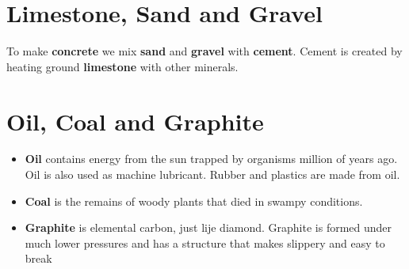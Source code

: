 \documentclass[12pt, letterpaper, twoside]{article}
\begin{document}
\section{Limestone, Sand and Gravel}
To make \textbf{concrete} we mix \textbf{sand} and \textbf{gravel} with \textbf{cement}. Cement is created by heating ground \textbf{limestone} with other minerals. 

\section{Oil, Coal and Graphite}
	\begin{itemize}
		\item \textbf{Oil} contains energy from the sun trapped by organisms million of years ago. Oil is also used as machine lubricant. Rubber and plastics are made from oil.
		\item \textbf{Coal} is the remains of woody plants that died in swampy conditions.
		\item \textbf{Graphite} is elemental carbon, just lije diamond. Graphite is formed under much lower pressures and has a structure that makes slippery and easy to break
	\end{itemize}
\end{document}
